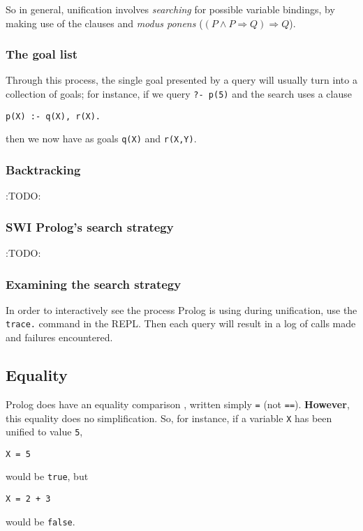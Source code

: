 \documentclass[11pt]{article}
\begin{document}
So in general, unification involves \emph{searching} for possible
variable bindings, by making use of the clauses
and \emph{modus ponens} (\((P ∧ P ⇒ Q) ⇒ Q\)).

\subsubsection{The goal list}
\label{sec:org3611a03}

Through this process, the single goal presented by a query
will usually turn into a collection of goals;
for instance, if we query \texttt{?- p(5)} and the search uses a clause
\begin{verbatim}
p(X) :- q(X), r(X).
\end{verbatim}
then we now have as goals \texttt{q(X)} and \texttt{r(X,Y)}.

\subsubsection{Backtracking}
\label{sec:org0603a91}
:TODO:

\subsubsection{SWI Prolog's search strategy}
\label{sec:org48719ec}
:TODO:

\subsubsection{Examining the search strategy}
\label{sec:org799d82b}
In order to interactively see the process Prolog is using
during unification,
use the \texttt{trace.} command in the REPL.
Then each query will result in a log of calls made and
failures encountered.

\subsection{Equality}
\label{sec:org5091c5e}
Prolog does have an equality comparison , written simply \texttt{=} (not \texttt{==}).
\textbf{However}, this equality does no simplification.
So, for instance, if a variable \texttt{X} has been unified to value \texttt{5},
\begin{verbatim}
X = 5
\end{verbatim}
would be \texttt{true}, but
\begin{verbatim}
X = 2 + 3
\end{verbatim}
would be \texttt{false}.
\end{document}
